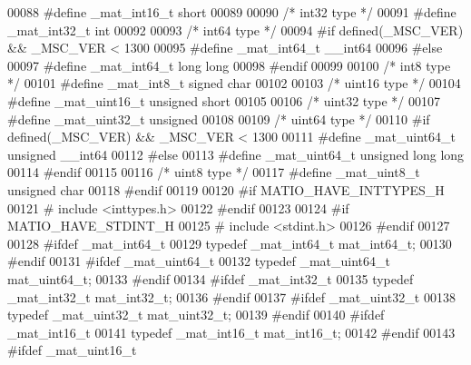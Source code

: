 \begin{DoxyCode}
00088 \textcolor{preprocessor}{#define \_mat\_int16\_t short}
00089 
00090 \textcolor{comment}{/* int32 type */}
00091 \textcolor{preprocessor}{#define \_mat\_int32\_t int}
00092 
00093 \textcolor{comment}{/* int64 type */}
00094 \textcolor{preprocessor}{#if defined(\_MSC\_VER) && \_MSC\_VER < 1300}
00095 \textcolor{preprocessor}{#define \_mat\_int64\_t \_\_int64}
00096 \textcolor{preprocessor}{#else}
00097 \textcolor{preprocessor}{#define \_mat\_int64\_t long long}
00098 \textcolor{preprocessor}{#endif}
00099 
00100 \textcolor{comment}{/* int8 type */}
00101 \textcolor{preprocessor}{#define \_mat\_int8\_t signed char}
00102 
00103 \textcolor{comment}{/* uint16 type */}
00104 \textcolor{preprocessor}{#define \_mat\_uint16\_t unsigned short}
00105 
00106 \textcolor{comment}{/* uint32 type */}
00107 \textcolor{preprocessor}{#define \_mat\_uint32\_t unsigned}
00108 
00109 \textcolor{comment}{/* uint64 type */}
00110 \textcolor{preprocessor}{#if defined(\_MSC\_VER) && \_MSC\_VER < 1300}
00111 \textcolor{preprocessor}{#define \_mat\_uint64\_t unsigned \_\_int64}
00112 \textcolor{preprocessor}{#else}
00113 \textcolor{preprocessor}{#define \_mat\_uint64\_t unsigned long long}
00114 \textcolor{preprocessor}{#endif}
00115 
00116 \textcolor{comment}{/* uint8 type */}
00117 \textcolor{preprocessor}{#define \_mat\_uint8\_t unsigned char}
00118 \textcolor{preprocessor}{#endif}
00119 
00120 \textcolor{preprocessor}{#if MATIO\_HAVE\_INTTYPES\_H}
00121 \textcolor{preprocessor}{#   include <inttypes.h>}
00122 \textcolor{preprocessor}{#endif}
00123 
00124 \textcolor{preprocessor}{#if MATIO\_HAVE\_STDINT\_H}
00125 \textcolor{preprocessor}{#   include <stdint.h>}
00126 \textcolor{preprocessor}{#endif}
00127 
00128 \textcolor{preprocessor}{#ifdef \_mat\_int64\_t}
00129     \textcolor{keyword}{typedef} \_mat\_int64\_t mat\_int64\_t;
00130 \textcolor{preprocessor}{#endif}
00131 \textcolor{preprocessor}{#ifdef \_mat\_uint64\_t}
00132     \textcolor{keyword}{typedef} \_mat\_uint64\_t mat\_uint64\_t;
00133 \textcolor{preprocessor}{#endif}
00134 \textcolor{preprocessor}{#ifdef \_mat\_int32\_t}
00135     \textcolor{keyword}{typedef} \_mat\_int32\_t mat\_int32\_t;
00136 \textcolor{preprocessor}{#endif}
00137 \textcolor{preprocessor}{#ifdef \_mat\_uint32\_t}
00138     \textcolor{keyword}{typedef} \_mat\_uint32\_t mat\_uint32\_t;
00139 \textcolor{preprocessor}{#endif}
00140 \textcolor{preprocessor}{#ifdef \_mat\_int16\_t}
00141     \textcolor{keyword}{typedef} \_mat\_int16\_t mat\_int16\_t;
00142 \textcolor{preprocessor}{#endif}
00143 \textcolor{preprocessor}{#ifdef \_mat\_uint16\_t}

\end{DoxyCode}
